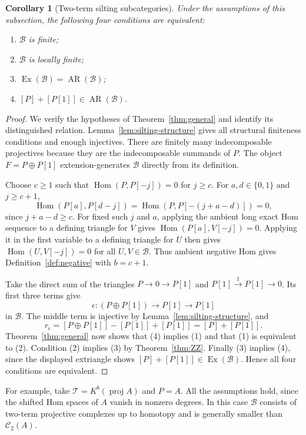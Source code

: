\documentclass[pdflatex,sn-mathphys-num]{sn-jnl}
\numberwithin{equation}{section}
\newtheorem{corollary}[theorem]{Corollary}
\theoremstyle{definition}
\theoremstyle{remark}\newtheorem{remark}[theorem]{Remark}
\newcommand{\C}{\mathcal C}
\newcommand{\Hom}{\operatorname{Hom}}
\newcommand{\Ex}{\operatorname{Ex}}
\newcommand{\AR}{\operatorname{AR}}
\begin{document}
\begin{corollary}[Two-term silting subcategories]\label{cor:silting}
Under the assumptions of this subsection, the following four
conditions are equivalent:
\begin{enumerate}
\item $\mathcal B$ is finite;
\item $\mathcal B$ is locally finite;
\item $\Ex(\mathcal B)=\AR(\mathcal B)$;
\item $[P]+[P[1]]\in\AR(\mathcal B)$.
\end{enumerate}
\end{corollary}
\begin{proof}
We verify the hypotheses of Theorem~\ref{thm:general} and identify
its distinguished relation. Lemma~\ref{lem:silting-structure}
gives all structural finiteness conditions and enough injectives.
There are finitely many indecomposable projectives because they
are the indecomposable summands of $P$. The object
$F=P\oplus P[1]$ extension-generates $\mathcal B$ directly from
its definition.

Choose $c\geq1$ such that $\Hom(P,P[-j])=0$ for $j\geq c$.
For $a,d\in\{0,1\}$ and $j\geq c+1$,
\[
 \Hom(P[a],P[d-j])=\Hom(P,P[-(j+a-d)])=0,
\]
since $j+a-d\geq c$. For fixed such $j$ and $a$, applying the
ambient long exact Hom sequence to a defining triangle for $V$
gives $\Hom(P[a],V[-j])=0$. Applying it in the first variable to
a defining triangle for $U$ then gives
$\Hom(U,V[-j])=0$ for all $U,V\in\mathcal B$. Thus ambient
negative Hom gives Definition~\ref{def:negative} with $b=c+1$.

Take the direct sum of the triangles $P\to0\to P[1]$ and
$P[1]\xrightarrow{1}P[1]\to0$. Its first three terms give
\[
 \epsilon:(P\oplus P[1])\longrightarrow P[1]\longrightarrow P[1]
\]
in $\mathcal B$. The middle term is injective by
Lemma~\ref{lem:silting-structure}, and
\[
 r_\epsilon=[P\oplus P[1]]-[P[1]]+[P[1]]=[P]+[P[1]].
\]
Theorem~\ref{thm:general} now shows that (4) implies (1) and that
(1) is equivalent to (2). Condition (2) implies (3) by
Theorem~\ref{thm:ZZ}. Finally (3) implies (4), since the displayed
extriangle shows $[P]+[P[1]]\in\Ex(\mathcal B)$. Hence all four
conditions are equivalent.
\end{proof}

For example, take $\mathcal T=K^b(\operatorname{proj}A)$ and $P=A$.
All the assumptions hold, since the shifted Hom spaces of $A$
vanish in nonzero degrees. In this case $\mathcal B$ consists of
two-term projective complexes up to homotopy and is generally
smaller than $\C_2(A)$.
\end{document}
